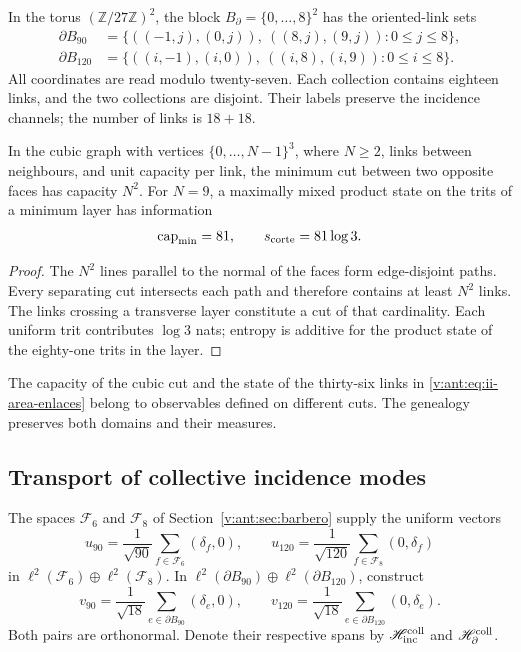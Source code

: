 In the torus \((\mathbb Z/27\mathbb Z)^2\), the block
\(B_\partial=\{0,\ldots,8\}^2\) has the oriented-link sets
\begin{align}
 \partial B_{90}
 &=\{((-1,j),(0,j)),\ ((8,j),(9,j)):0\le j\le8\},\\
 \partial B_{120}
 &=\{((i,-1),(i,0)),\ ((i,8),(i,9)):0\le i\le8\}.
 \label{v:ant:eq:ii-area-enlaces}
\end{align}
All coordinates are read modulo twenty-seven. Each collection contains
eighteen links, and the two collections are disjoint. Their labels preserve the
incidence channels; the number of links is \(18+18\).

\begin{theorem}
\label{v:ant:thm:ii-area-corte-minimo}
In the cubic graph with vertices \(\{0,\ldots,N-1\}^3\), where
\(N\ge2\), links between neighbours, and unit capacity per link,
the minimum cut between two opposite faces has capacity \(N^2\).
For \(N=9\), a maximally mixed product state on the
trits of a minimum layer has information
\begin{equation}
 \operatorname{cap}_{\min}=81,\qquad s_{\rm corte}=81\log3.
 \label{v:ant:eq:ii-area-corte-informacion}
\end{equation}
\end{theorem}
\begin{proof}
The \(N^2\) lines parallel to the normal of the faces form
edge-disjoint paths. Every separating cut intersects each path and
therefore contains at least \(N^2\) links. The links crossing
a transverse layer constitute a cut of that cardinality. Each uniform trit
contributes \(\log3\) nats; entropy is additive for the product
state of the eighty-one trits in the layer.
\end{proof}

The capacity of the cubic cut and the state of the thirty-six links
in \eqref{v:ant:eq:ii-area-enlaces} belong to observables defined on
different cuts. The genealogy preserves both domains and their measures.

\subsection{Transport of collective incidence modes}
\label{v:ant:sec:ii-area-transporte-colectivo}

The spaces \(\mathcal F_6\) and \(\mathcal F_8\) of
Section~\ref{v:ant:sec:barbero} supply the uniform vectors
\[
 u_{90}=\frac1{\sqrt{90}}\sum_{f\in\mathcal F_6}(\delta_f,0),
 \qquad
 u_{120}=\frac1{\sqrt{120}}\sum_{f\in\mathcal F_8}(0,\delta_f)
\]
in \(\ell^2(\mathcal F_6)\oplus\ell^2(\mathcal F_8)\).
In \(\ell^2(\partial B_{90})\oplus\ell^2(\partial B_{120})\),
construct
\[
 v_{90}=\frac1{\sqrt{18}}\sum_{e\in\partial B_{90}}(\delta_e,0),
 \qquad
 v_{120}=\frac1{\sqrt{18}}\sum_{e\in\partial B_{120}}(0,\delta_e).
\]
Both pairs are orthonormal. Denote their respective spans by
\(\mathscr H_{\rm inc}^{\rm coll}\) and
\(\mathscr H_\partial^{\rm coll}\).


